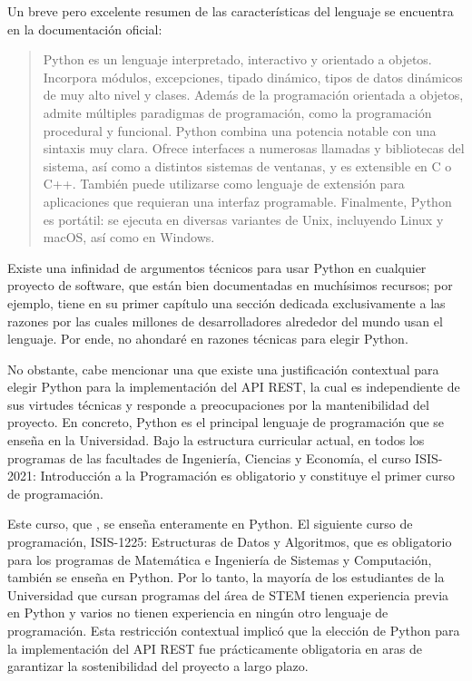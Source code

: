 Un breve pero excelente resumen de las características del lenguaje se encuentra en la documentación oficial:
\begin{quote}
	\gls{Python} es un lenguaje interpretado, interactivo y orientado a objetos. Incorpora módulos, excepciones, tipado dinámico, tipos de datos dinámicos de muy alto nivel y clases. Además de la programación orientada a objetos, admite múltiples paradigmas de programación, como la programación procedural y funcional. \gls{Python} combina una potencia notable con una sintaxis muy clara. Ofrece interfaces a numerosas llamadas y bibliotecas del sistema, así como a distintos sistemas de ventanas, y es extensible en C o C++. También puede utilizarse como lenguaje de extensión para aplicaciones que requieran una interfaz programable. Finalmente, \gls{Python} es portátil: se ejecuta en diversas variantes de Unix, incluyendo Linux y macOS, así como en Windows. \cite{python_official_docs}
\end{quote}
\noindent Existe una infinidad de argumentos técnicos para usar \gls{Python} en cualquier proyecto de software, que están bien documentadas en muchísimos recursos; por ejemplo, \cite{learning_python} tiene en su primer capítulo una sección dedicada exclusivamente a las razones por las cuales millones de desarrolladores alrededor del mundo usan el lenguaje. Por ende, no ahondaré en razones técnicas para elegir \gls{Python}.

No obstante, cabe mencionar una que existe una justificación contextual para elegir \gls{Python} para la implementación del \gls{API REST}, la cual es independiente de sus virtudes técnicas y responde a preocupaciones por la mantenibilidad del proyecto. En concreto, \gls{Python} es el principal lenguaje de programación que se enseña en la Universidad. Bajo la estructura curricular actual, en todos los programas de las facultades de Ingeniería, Ciencias y Economía, el curso ISIS-2021: Introducción a la Programación es obligatorio y constituye el primer curso de programación. %

Este curso, que  \cite{ip}, se enseña enteramente en \gls{Python}. El siguiente curso de programación, ISIS-1225: Estructuras de Datos y Algoritmos, que es obligatorio para los programas de Matemática e Ingeniería de Sistemas y Computación, también se enseña en \gls{Python}. %
Por lo tanto, la mayoría de los estudiantes de la Universidad que cursan programas del área de STEM tienen experiencia previa en \gls{Python} y varios no tienen experiencia en ningún otro lenguaje de programación. Esta restricción contextual implicó que la elección de \gls{Python} para la implementación del \gls{API REST} fue prácticamente obligatoria en aras de garantizar la sostenibilidad del proyecto a largo plazo.

